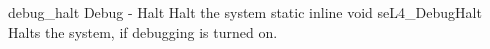 %
%
%

\apidoc
{debug_halt}
{Debug - Halt}
{Halt the system}
{static inline void seL4\_DebugHalt}
{
}
{\noret}
{Halts the system, if debugging is turned on.}
